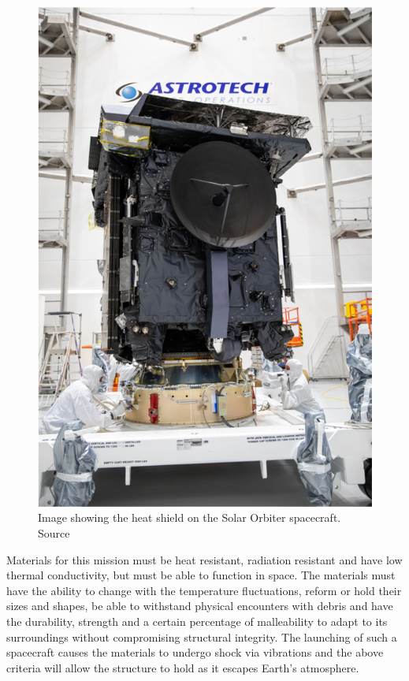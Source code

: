 \documentclass[12pt]{article}
\begin{document}
\begin{figure}[H]
\centering
\includegraphics[scale=0.7]{Media/Document/Picture 1.png}
\caption{Image showing the heat shield on the Solar Orbiter spacecraft. Source \cite{SolarOrbiter}}
\label{SolarOrbiter}
\end{figure}

Materials for this mission must be heat resistant, radiation resistant and have low thermal conductivity, but must be able to function in space. The materials must have the ability to change with the temperature fluctuations, reform or hold their sizes and shapes, be able to withstand physical encounters with debris and have the durability, strength and a certain percentage of malleability to adapt to its surroundings without compromising structural integrity. The launching of such a spacecraft causes the materials to undergo shock via vibrations and the above criteria will allow the structure to hold as it escapes Earth's atmosphere. \\
\end{document}
